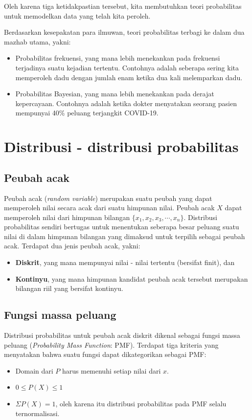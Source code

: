 Oleh karena tiga ketidakpastian tersebut, kita membutuhkan teori probabilitas untuk memodelkan data yang telah kita peroleh. 

Berdasarkan kesepakatan para ilmuwan, teori probabilitas terbagi ke dalam dua mazhab utama, yakni:
\begin{itemize}
	\item Probabilitas frekuensi, yang mana lebih menekankan pada frekuensi terjadinya suatu kejadian tertentu. Contohnya adalah seberapa sering kita memperoleh dadu dengan jumlah enam ketika dua kali melemparkan dadu.
	\item Probabilitas Bayesian, yang mana lebih menekankan pada derajat kepercayaan. Contohnya adalah ketika dokter menyatakan seorang pasien mempunyai 40\% peluang terjangkit COVID-19.
\end{itemize}
\section{Distribusi - distribusi probabilitas}
\subsection{Peubah acak}
Peubah acak (\textit{random variable}) merupakan suatu peubah yang dapat memperoleh nilai secara acak dari suatu himpunan nilai. Peubah acak $X$ dapat memperoleh nilai dari himpunan bilangan $\{x_{1}, x_{2}, x_{3}, \cdots, x_{n}\}$. Distribusi probabilitas sendiri bertugas untuk menentukan seberapa besar peluang suatu nilai di dalam himpunan bilangan yang dimaksud untuk terpilih sebagai peubah acak. Terdapat dua jenis peubah acak, yakni:
\begin{itemize}
\item \textbf{Diskrit}, yang mana mempunyai nilai - nilai tertentu (bersifat finit), dan
\item \textbf{Kontinyu}, yang mana himpunan kandidat peubah acak tersebut merupakan bilangan riil yang bersifat kontinyu.
\end{itemize} 

\subsection{Fungsi massa peluang} 
Distribusi probabilitas untuk peubah acak diskrit dikenal sebagai fungsi massa peluang (\textit{Probability Mass Function}: PMF). Terdapat tiga kriteria yang menyatakan bahwa suatu fungsi dapat dikategorikan sebagai PMF:
\begin{itemize}
\item Domain dari $P$ harus memenuhi setiap nilai dari $x$.
\item $0 \leq P(X) \leq 1$
\item $\Sigma P(X) = 1$, oleh karena itu distribusi probabilitas pada PMF selalu ternormalisasi.
\end{itemize}

